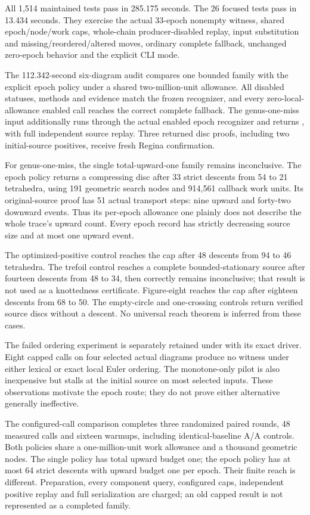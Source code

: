 All 1,514 maintained tests pass in 285.175 seconds. The 26 focused tests
pass in 13.434 seconds. They exercise the actual 33-epoch nonempty witness,
shared epoch/node/work caps, whole-chain producer-disabled replay, input
substitution and missing/reordered/altered moves, ordinary complete fallback,
unchanged zero-epoch behavior and the explicit CLI mode.

The 112.342-second six-diagram audit compares one bounded family with the
explicit epoch policy under a shared two-million-unit allowance. All disabled
statuses, methods and evidence match the frozen recognizer, and every
zero-local-allowance enabled call reaches the correct complete fallback.
The genus-one-miss input additionally runs through the actual enabled epoch
recognizer and returns , with full independent
source replay. Three returned disc proofs, including two initial-source
positives, receive fresh Regina confirmation.

For genus-one-miss, the single total-upward-one family remains inconclusive.
The epoch policy returns a compressing disc after 33 strict descents from
54 to 21 tetrahedra, using 191 geometric search nodes and 914,561 callback
work units. Its original-source proof has 51 actual transport steps: nine
upward and forty-two downward events. Thus its per-epoch allowance one
plainly does not describe the whole trace's upward count. Every epoch
record has strictly decreasing source size and at most one upward event.

The optimized-positive control reaches the cap after 48 descents from 94
to 46 tetrahedra. The trefoil control reaches a complete bounded-stationary
source after fourteen descents from 48 to 34, then correctly remains
inconclusive; that result is not used as a knottedness certificate.
Figure-eight reaches the cap after eighteen descents from 68 to 50.
The empty-circle and one-crossing controls return verified source discs
without a descent. No universal reach theorem is inferred from these cases.

The failed ordering experiment is separately retained under
 with its exact driver. Eight capped calls
on four selected actual diagrams produce no witness under either lexical
or exact local Euler ordering. The monotone-only pilot is also inexpensive
but stalls at the initial source on most selected inputs. These observations
motivate the epoch route; they do not prove either alternative generally
ineffective.

The configured-call comparison completes three randomized paired rounds,
48 measured calls and sixteen warmups, including identical-baseline A/A
controls. Both policies share a one-million-unit work allowance and a
thousand geometric nodes. The single policy has total upward budget one;
the epoch policy has at most 64 strict descents with upward budget one per
epoch. Their finite reach is different. Preparation, every component query,
configured caps, independent positive replay and full serialization are
charged; an old capped result is not represented as a completed family.

